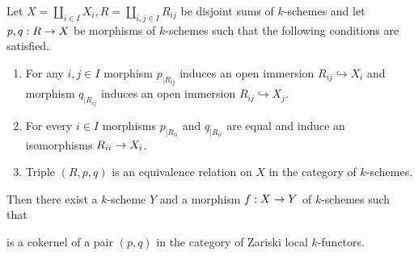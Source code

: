 \begin{lemma}\label{lemma:recollement}
Let $X = \coprod_{i\in I}X_i, R = \coprod_{i,j\in I}R_{ij}$ be disjoint sums of $k$-schemes and let $p,q:R\rightarrow X$ be morphisms of $k$-schemes such that the following conditions are satisfied.
\begin{enumerate}[label=\emph{\textbf{(\arabic*)}}, leftmargin=3.0em]
\item For any $i,j\in I$ morphism $p_{\mid R_{ij}}$ induces an open immersion $R_{ij}\hookrightarrow X_i$ and morphism $q_{\mid R_{ij}}$ induces an open immersion $R_{ij}\hookrightarrow X_j$.
\item For every $i\in I$ morphisms $p_{\mid R_{ii}}$ and $q_{\mid R_{ii}}$ are equal and induce an isomorphisms $R_{ii}\rightarrow X_i$.  
\item Triple $\left(R,p,q\right)$ is an equivalence relation on $X$ in the category of $k$-schemes.
\end{enumerate}
Then there exist a $k$-scheme $Y$ and a morphism $f:X\rightarrow Y$ of $k$-schemes such that
\begin{center}
\end{center}
is a cokernel of a pair $(p,q)$ in the category of Zariski local $k$-functors.
\end{lemma}

